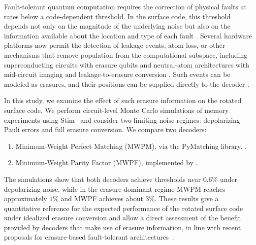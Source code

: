 \documentclass[11pt, notitlepage, letterpaper]{article}
\begin{document}
Fault-tolerant quantum computation requires the correction of physical faults at rates below a code-dependent threshold. In the surface code, this threshold depends not only on the magnitude of the underlying noise but also on the information available about the location and type of each fault \cite{fowler_surface_2012}\cite{acharya_quantum_2025}\cite{bluvstein_logical_2024}. Several hardware platforms now permit the detection of leakage events, atom loss, or other mechanisms that remove population from the computational subspace, including superconducting circuits with erasure qubits and neutral-atom architectures with mid-circuit imaging and leakage-to-erasure conversion \cite{kubica_erasure_2023}\cite{wu_erasure_2022}\cite{ma_high-fidelity_2023}\cite{scholl_erasure_2023}\cite{chow_circuit-based_2024}\cite{reichardt_fault-tolerant_2025}. Such events can be modeled as erasures, and their positions can be supplied directly to the decoder \cite{gu_fault-tolerant_2025}\cite{gu_optimizing_2024}\cite{sahay_high-threshold_2023}\cite{chadwick_erasure_2025}.

In this study, we examine the effect of such erasure information on the rotated surface code. We perform circuit-level Monte Carlo simulations of memory experiments using Stim~\cite{gidney_stim_2021} and consider two limiting noise regimes: depolarizing Pauli errors and full erasure conversion. We compare two decoders:

\begin{enumerate}
    \item Minimum-Weight Perfect Matching (MWPM), via the PyMatching library. \cite{oscarhiggott_oscarhiggottpymatching_2025}\cite{oscarhiggott_oscarhiggottpymatching_2025}\cite{higgott_sparse_2025}.
    \item Minimum-Weight Parity Factor (MWPF), implemented by \citeauthor{wu_minimum-weight_2025} \cite{wu_yuewuomwpf_2025}\cite{wu_minimum-weight_2025}.
\end{enumerate}

The simulations show that both decoders achieve thresholds near $0.6\%$ under depolarizing noise, while in the erasure-dominant regime MWPM reaches approximately $1\%$ and MWPF achieves about $3\%$. These results give a quantitative reference for the expected performance of the rotated surface code under idealized erasure conversion and allow a direct assessment of the benefit provided by decoders that make use of erasure information, in line with recent proposals for erasure-based fault-tolerant architectures~\cite{kubica_erasure_2023}\cite{gu_fault-tolerant_2025}\cite{sahay_high-threshold_2023}\cite{chadwick_erasure_2025}.
\end{document}
